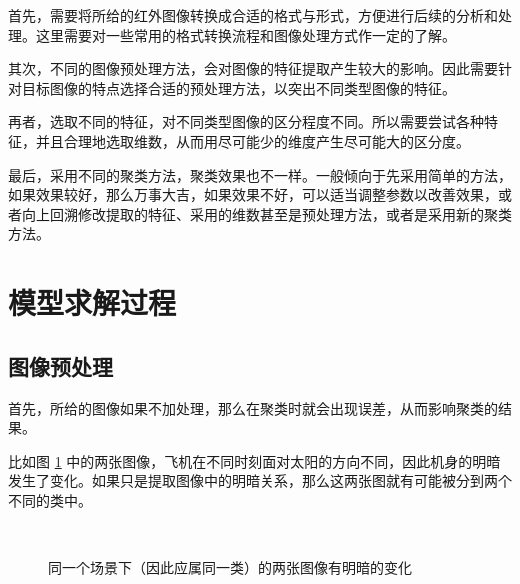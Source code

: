 \documentclass[a4paper, 12pt]{article}
\begin{document}
首先，需要将所给的红外图像转换成合适的格式与形式，方便进行后续的分析和处理。这里需要对一些常用的格式转换流程和图像处理方式作一定的了解。

其次，不同的图像预处理方法，会对图像的特征提取产生较大的影响。因此需要针对目标图像的特点选择合适的预处理方法，以突出不同类型图像的特征。

再者，选取不同的特征，对不同类型图像的区分程度不同。所以需要尝试各种特征，并且合理地选取维数，从而用尽可能少的维度产生尽可能大的区分度。

最后，采用不同的聚类方法，聚类效果也不一样。一般倾向于先采用简单的方法，如果效果较好，那么万事大吉，如果效果不好，可以适当调整参数以改善效果，或者向上回溯修改提取的特征、采用的维数甚至是预处理方法，或者是采用新的聚类方法。

\section{模型求解过程}

\subsection{图像预处理}
首先，所给的图像如果不加处理，那么在聚类时就会出现误差，从而影响聚类的结果。

比如图 \ref{fig:a} 中的两张图像，飞机在不同时刻面对太阳的方向不同，因此机身的明暗发生了变化。如果只是提取图像中的明暗关系，那么这两张图就有可能被分到两个不同的类中。

\begin{figure}[htbp]
    \centering
    \phantom{123}
    \\
    \caption{同一个场景下（因此应属同一类）的两张图像有明暗的变化}
    \label{fig:a}
\end{figure}
\end{document}
